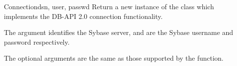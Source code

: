 %
%
%
%

\begin{classdesc}{Connection}{dsn, user, passwd \optional{, \ldots}}
Return a new instance of the  class which implements
the DB-API 2.0 connection functionality.

The  argument identifies the Sybase server,  and
 are the Sybase username and password respectively.

The optional arguments are the same as those supported by the
 function.
\end{classdesc}

